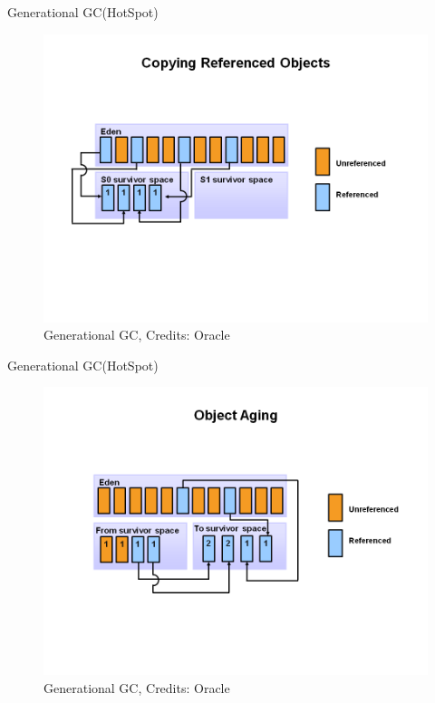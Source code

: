 \documentclass{beamer}
\begin{document}
\begin{frame}{Generational GC(HotSpot)}
\begin{figure}
	\centering
	\includegraphics[width=0.9\linewidth]{Images/generational2}
	\caption{Generational GC, Credits: Oracle}
\end{figure}
\end{frame}

\begin{frame}{Generational GC(HotSpot)}
\begin{figure}
	\centering
	\includegraphics[width=0.9\linewidth]{Images/generational3}
	\caption{Generational GC, Credits: Oracle}
\end{figure}
\end{frame}
\end{document}
